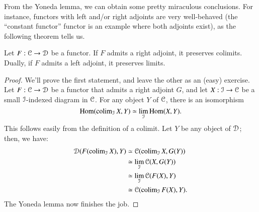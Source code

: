 From the Yoneda lemma, we can obtain some pretty miraculous conclusions.
For instance, functors with left and/or right adjoints are very well-behaved
(the ``constant functor'' functor is an example where both adjoints exist),
as the following theorem tells us.
\begin{theorem}\label{adjointslimits}
    Let $F:\mathcal C\to\mathcal D$ be a functor.
    If $F$ admits a right adjoint, it preserves colimits.
    Dually, if $F$ admits a left adjoint, it preserves limits.
\end{theorem}
\begin{proof}
    We'll prove the first statement, and leave the other as an (easy) exercise.
    Let $F:\mathcal C\to\mathcal D$ be a functor that admits a right adjoint $G$, and let $X:\mathcal I\to\mathcal C$ be a
    small $\mathcal I$-indexed diagram in $\mathcal C$.
    For any object $Y$ of $\mathcal C$, there is an isomorphism
    $$\operatorname{Hom}(\operatorname{colim}_{\mathcal I} X, Y) \simeq \lim_{\mathcal I}\operatorname{Hom}(X, Y).$$
    This follows easily from the definition of a colimit.
    Let $Y$ be any object of $\mathcal D$; then, we have:
    \begin{align*}
	\mathcal D(F(\operatorname{colim}_{\mathcal I} X), Y) & \simeq \mathcal C(\operatorname{colim}_{\mathcal I} X, G(Y))\\
	& \simeq \lim_{\mathcal I}\mathcal C(X, G(Y))\\
	& \simeq \lim_{\mathcal I}\mathcal C(F(X), Y)\\
	& \simeq \mathcal C(\operatorname{colim}_{\mathcal I}F(X), Y).
    \end{align*}
    The Yoneda lemma now finishes the job.
\end{proof}
